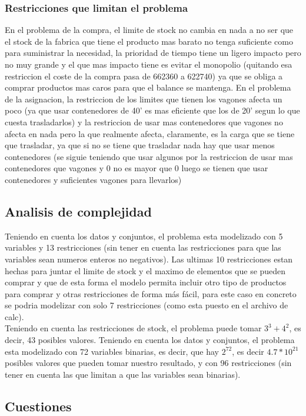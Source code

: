 \documentclass[11pt,spanish]{article}
\begin{document}
			\subsubsection{Restricciones que limitan el problema}
			En el problema de la compra, el limite de stock no cambia en nada a no ser que el stock de la fabrica que tiene el producto mas barato no tenga suficiente como para suministrar la necesidad, la prioridad de tiempo tiene un ligero impacto pero no muy grande y el que mas impacto tiene es evitar el monopolio (quitando esa restriccion el coste de la compra pasa de 662360 a 622740) ya que se obliga a comprar productos mas caros para que el balance se mantenga.
			En el problema de la asignacion, la restriccion de los limites que tienen los vagones afecta un poco (ya que usar contenedores de 40' es mas eficiente que los de 20' segun lo que cuesta trasladarlos) y la restriccion de usar mas contenedores que vagones no afecta en nada pero la que realmente afecta, claramente, es la carga que se tiene que trasladar, ya que si no se tiene que trasladar nada hay que usar menos contenedores (se siguie teniendo que usar algunos por la restriccion de usar mas contenedores que vagones y 0 no es mayor que 0 luego se tienen que usar contenedores y suficientes vagones para llevarlos)
		\subsection{Analisis de complejidad}
		Teniendo en cuenta los datos y conjuntos, el problema esta modelizado con 5 variables y 13 restricciones (sin tener en cuenta las restricciones para que las variables sean numeros enteros no negativos). Las ultimas 10 restricciones estan hechas para juntar el limite de stock y el maximo de elementos que se pueden comprar y que de esta forma el modelo permita incluir otro tipo de productos para comprar y otras restricciones de forma más fácil, para este caso en concreto se podria modelizar con solo 7 restricciones (como esta puesto en el archivo de calc).\\
		Teniendo en cuenta las restricciones de stock, el problema puede tomar $3^3+4^2$, es decir, 43 posibles valores.
		Teniendo en cuenta los datos y conjuntos, el problema esta modelizado con 72 variables binarias, es decir, que hay $2^{72}$, es decir $4.7*10^{21}$ posibles valores que pueden tomar nuestro resultado, y con 96 restricciones (sin tener en cuenta las que limitan a que las variables sean binarias).
		\subsection{Cuestiones}
\end{document}
